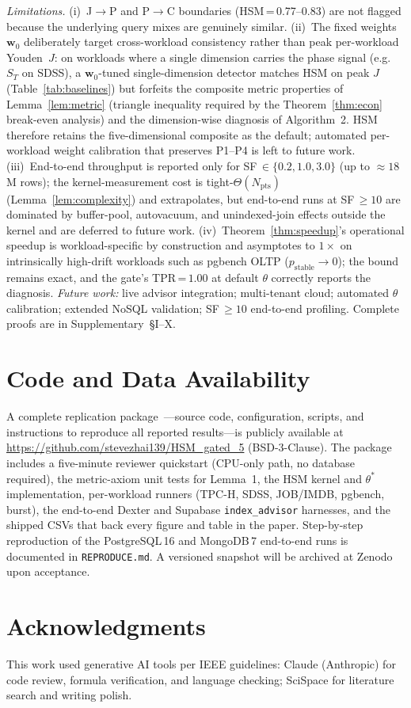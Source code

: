 \documentclass[10pt,journal,compsoc]{IEEEtran}
\newcommand{\ST}{S_{T}}
\newcommand{\Npts}{N_{\mathrm{pts}}}
\newcommand{\thetastar}{\theta^{*}}
\begin{document}
\textit{Limitations.}\label{sec:limitations}
(i)~J$\to$P and P$\to$C boundaries (HSM\,=\,0.77--0.83) are not
flagged because the underlying query mixes are genuinely similar.
(ii)~The fixed weights $\mathbf{w}_0$ deliberately target
cross-workload consistency rather than peak per-workload Youden~$J$:
on workloads where a single dimension carries the phase signal
(e.g.\ $\ST$ on SDSS), a $\mathbf{w}_0$-tuned single-dimension
detector matches HSM on peak $J$ (Table~\ref{tab:baselines}) but
forfeits the composite metric properties of
Lemma~\ref{lem:metric} (triangle inequality required by the
Theorem~\ref{thm:econ} break-even analysis) and the
dimension-wise diagnosis of Algorithm~2. HSM therefore retains the
five-dimensional composite as the default; automated per-workload
weight calibration that preserves P1--P4 is left to future work.
(iii)~End-to-end throughput is reported only for
SF\,$\in\{0.2,1.0,3.0\}$ (up to $\approx\!18$\,M rows);
the kernel-measurement cost is tight-$\Theta(\Npts)$
(Lemma~\ref{lem:complexity}) and extrapolates, but end-to-end runs at
SF\,$\geq\!10$ are dominated by buffer-pool, autovacuum, and
unindexed-join effects outside the kernel and are deferred to future work.
(iv)~Theorem~\ref{thm:speedup}'s operational speedup is
workload-specific by construction and asymptotes to $1\!\times$
on intrinsically high-drift workloads such as pgbench OLTP
($p_{\mathrm{stable}}\!\to\!0$); the bound remains exact, and the
gate's TPR\,=\,$1.00$ at default $\theta$ correctly reports the
diagnosis.
\textit{Future work:} live advisor integration; multi-tenant
cloud; automated $\theta$ calibration; extended NoSQL validation;
SF\,$\geq\!10$ end-to-end profiling.
Complete proofs are in Supplementary~\S I--X.

\section*{Code and Data Availability}
A complete replication package~\cite{HSM2026Repo}---source code,
configuration, scripts, and instructions to reproduce all reported
results---is publicly available at
\url{https://github.com/stevezhai139/HSM_gated_5} (BSD-3-Clause).
The package includes a five-minute reviewer quickstart (CPU-only path,
no database required), the metric-axiom unit tests for Lemma~1, the
HSM kernel and $\thetastar$ implementation, per-workload runners
(TPC-H, SDSS, JOB/IMDB, pgbench, burst), the end-to-end Dexter and
Supabase \texttt{index\_advisor} harnesses, and the shipped CSVs that
back every figure and table in the paper. Step-by-step reproduction
of the PostgreSQL\,16 and MongoDB\,7 end-to-end runs is documented in
\texttt{REPRODUCE.md}. A versioned snapshot will be archived at Zenodo
upon acceptance.

\section*{Acknowledgments}
This work used generative AI tools per IEEE guidelines:
Claude (Anthropic) for code review, formula verification, and language checking;
SciSpace for literature search and writing polish.



\end{document}
